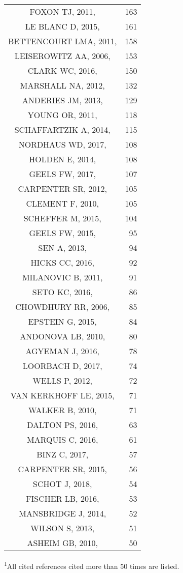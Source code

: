 \documentclass[]{article}
\begin{document}
\begin{longtable}{cr}
FOXON TJ, 2011,  & 163 \\ 
LE BLANC D, 2015,  & 161 \\ 
BETTENCOURT LMA, 2011,  & 158 \\ 
LEISEROWITZ AA, 2006,  & 153 \\ 
CLARK WC, 2016,  & 150 \\ 
MARSHALL NA, 2012,  & 132 \\ 
ANDERIES JM, 2013,  & 129 \\ 
YOUNG OR, 2011,  & 118 \\ 
SCHAFFARTZIK A, 2014,  & 115 \\ 
NORDHAUS WD, 2017,  & 108 \\ 
HOLDEN E, 2014,  & 108 \\ 
GEELS FW, 2017,  & 107 \\ 
CARPENTER SR, 2012,  & 105 \\ 
CLEMENT F, 2010,  & 105 \\ 
SCHEFFER M, 2015,  & 104 \\ 
GEELS FW, 2015,  & 95 \\ 
SEN A, 2013,  & 94 \\ 
HICKS CC, 2016,  & 92 \\ 
MILANOVIC B, 2011,  & 91 \\ 
SETO KC, 2016,  & 86 \\ 
CHOWDHURY RR, 2006,  & 85 \\ 
EPSTEIN G, 2015,  & 84 \\ 
ANDONOVA LB, 2010,  & 80 \\ 
AGYEMAN J, 2016,  & 78 \\ 
LOORBACH D, 2017,  & 74 \\ 
WELLS P, 2012,  & 72 \\ 
VAN KERKHOFF LE, 2015,  & 71 \\ 
WALKER B, 2010,  & 71 \\ 
DALTON PS, 2016,  & 63 \\ 
MARQUIS C, 2016,  & 61 \\ 
BINZ C, 2017,  & 57 \\ 
CARPENTER SR, 2015,  & 56 \\ 
SCHOT J, 2018,  & 54 \\ 
FISCHER LB, 2016,  & 53 \\ 
MANSBRIDGE J, 2014,  & 52 \\ 
WILSON S, 2013,  & 51 \\ 
ASHEIM GB, 2010,  & 50 \\ 
\bottomrule
\end{longtable}
\vspace{-5mm}
\begin{minipage}{\linewidth}
\textsuperscript{1}All cited references cited more than 50 times are listed. \\ 
\end{minipage}
\end{document}
